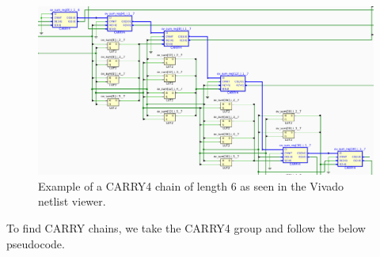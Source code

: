 \documentclass[twocolumn]{article}
\begin{document}
            \begin{figure}[t]
                \centering
                \includegraphics[width=\textwidth]{figures/carry_chain_edif.png}
                \caption{Example of a CARRY4 chain of length 6 as seen in the Vivado netlist viewer.}
                \label{fig:carry_chain_edif}
            \end{figure}

            
            To find CARRY chains, we take the CARRY4 group and follow the below pseudocode. 
\end{document}

